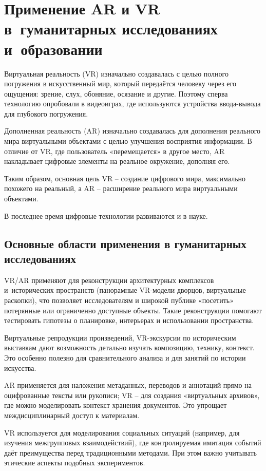 \documentclass{ou}
\begin{document}
\section{Применение AR и VR в~гуманитарных исследованиях и~образовании}
Виртуальная реальность (VR) изначально создавалась с целью полного погружения в искусственный мир, который передаётся человеку через его ощущения: зрение, слух, обоняние, осязание и другие. Поэтому сперва технологию опробовали в видеоиграх, где используются устройства ввода-вывода для глубокого погружения. 

Дополненная реальность (AR) изначально создавалась для дополнения реального мира виртуальными объектами с целью улучшения восприятия информации. В отличие от VR, где пользователь «перемещается» в другое место, AR накладывает цифровые элементы на реальное окружение, дополняя его. 

Таким образом, основная цель VR -- создание цифрового мира, максимально похожего на реальный, а AR -- расширение реального мира виртуальными объектами.

В последнее время цифровые технологии развиваются и в науке.
\subsection{Основные области применения в гуманитарных исследованиях}
VR/AR применяют для реконструкции архитектурных комплексов и~исторических пространств (панорамные VR-модели дворцов, виртуальные раскопки), что позволяет исследователям и широкой публике «посетить» потерянные или ограниченно доступные объекты. Такие реконструкции помогают тестировать гипотезы о планировке, интерьерах и использовании пространства. 

Виртуальные репродукции произведений, VR-экскурсии по историческим выставкам дают возможность детально изучать композицию, технику, контекст. Это особенно полезно для сравнительного анализа и для занятий по истории искусства. 

AR применяется для наложения метаданных, переводов и аннотаций прямо на оцифрованные тексты или рукописи; VR -- для создания «виртуальных архивов», где можно моделировать контекст хранения документов. Это упрощает междисциплинарный доступ к материалам. 

VR используется для моделирования социальных ситуаций (например, для изучения межгрупповых взаимодействий), где контролируемая имитация событий даёт преимущества перед традиционными методами. При этом важно учитывать этические аспекты подобных экспериментов. 
\end{document}
